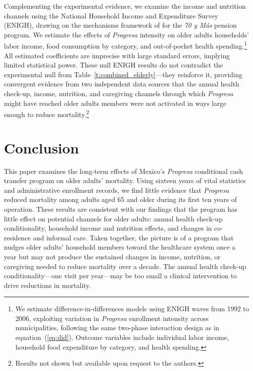 \documentclass[12pt]{article}
\begin{document}
\p Complementing the experimental evidence, we examine the income and nutrition channels using the National Household Income and Expenditure Survey (ENIGH), drawing on the mechanisms framework of \cite{Menares2026JHR} for the \textit{70 y Más} pension program. We estimate the effects of \textit{Progresa} intensity on older adults households' labor income, food consumption by category, and out-of-pocket health spending.\footnote{We estimate difference-in-differences models using ENIGH waves from 1992 to 2006, exploiting variation in \textit{Progresa} enrollment intensity across municipalities, following the same two-phase interaction design as in equation~(\ref{eq:did}). Outcome variables include individual labor income, household food expenditure by category, and health spending.} All estimated coefficients are imprecise with large standard errors, implying limited statistical power. These null ENIGH results do not contradict the experimental null from Table~\ref{t:combined_elderly}—they reinforce it, providing convergent evidence from two independent data sources that the annual health check-up, income, nutrition, and caregiving channels through which \textit{Progresa} might have reached older adults members were not activated in ways large enough to reduce mortality.\footnote{Results not shown but available upon request to the authors.}


\section{Conclusion}\label{s:conclusion}

\p This paper examines the long-term effects of Mexico's \textit{Progresa} conditional cash transfer program on older adults' mortality. Using sixteen years of vital statistics and administrative enrollment records, we find little evidence that \textit{Progresa} reduced mortality among adults aged 65 and older during its first ten years of operation. These results are consistent with our findings that the program has little effect on potential channels for older adults: annual health check-up conditionality, household income and nutrition effects, and changes in co-residence and informal care. Taken together, the picture is of a program that nudges older adults' household members toward the healthcare system once a year but may not produce the sustained changes in income, nutrition, or caregiving needed to reduce mortality over a decade. The annual health check-up conditionality—one visit per year—may be too small a clinical intervention to drive reductions in mortality. 
\end{document}
